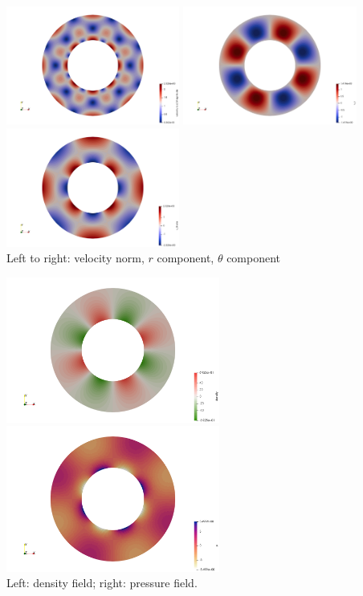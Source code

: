 \begin{center}
\includegraphics[width=5.7cm]{python_codes/fieldstone_09/RESULTS/velocity}
\includegraphics[width=5.7cm]{python_codes/fieldstone_09/RESULTS/vr}
\includegraphics[width=5.7cm]{python_codes/fieldstone_09/RESULTS/vtheta}\\
{\captionfont Left to right: velocity norm, $r$ component, $\theta$ component}
\end{center}

\begin{center}
\includegraphics[width=7cm]{python_codes/fieldstone_09/RESULTS/density}
\includegraphics[width=7cm]{python_codes/fieldstone_09/RESULTS/pressure}\\
{\captionfont Left: density field; right: pressure field.}
\end{center}

